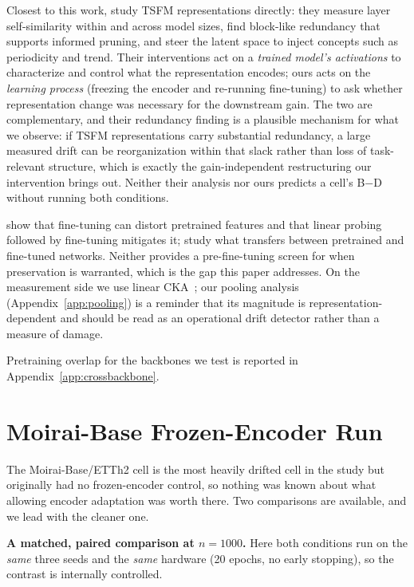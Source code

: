 \documentclass{article}
\begin{document}
Closest to this work, \citet{wilinski2025representations} study TSFM representations directly:
they measure layer self-similarity within and across model sizes, find block-like redundancy that
supports informed pruning, and steer the latent space to inject concepts such as periodicity and
trend. Their interventions act on a \emph{trained model's activations} to characterize and control
what the representation encodes; ours acts on the \emph{learning process} (freezing the encoder
and re-running fine-tuning) to ask whether representation change was necessary for the downstream
gain. The two are complementary, and their redundancy finding is a plausible mechanism for what we
observe: if TSFM representations carry substantial redundancy, a large measured drift can be
reorganization within that slack rather than loss of task-relevant structure, which is exactly the
gain-independent restructuring our intervention brings out. Neither their analysis nor ours predicts
a cell's B$-$D without running both conditions.

\citet{kumar2022finetuning} show that fine-tuning can distort pretrained features and that
linear probing followed by fine-tuning mitigates it; \citet{neyshabur2020transferred} study what
transfers between pretrained and fine-tuned networks. Neither provides a pre-fine-tuning screen
for when preservation is warranted, which is the gap this paper addresses. On the measurement
side we use linear CKA~\citep{kornblith2019cka}; our pooling analysis
(Appendix~\ref{app:pooling}) is a reminder that its magnitude is representation-dependent and
should be read as an operational drift detector rather than a measure of damage.

Pretraining overlap for the backbones we test is reported in
Appendix~\ref{app:crossbackbone}.

\section{Moirai-Base Frozen-Encoder Run}
\label{app:based}

The Moirai-Base/ETTh2 cell is the most heavily drifted cell in the study but originally had no
frozen-encoder control, so nothing was known about what allowing encoder adaptation was worth there. Two
comparisons are available, and we lead with the cleaner one.

\textbf{A matched, paired comparison at $n{=}1000$.}
Here both conditions run on the \emph{same} three seeds and the \emph{same} hardware (20 epochs, no
early stopping), so the contrast is internally controlled.
\end{document}
